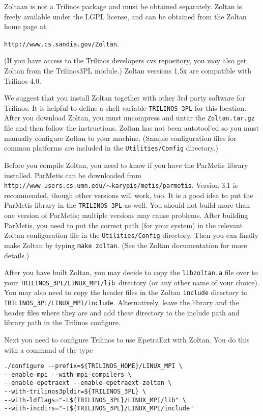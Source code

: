 Zoltaan is not a Trilinos package and must be obtained separately.
Zoltan is freely available under the LGPL license, and can
be obtained from the Zoltan home page at 

\texttt{http://www.cs.sandia.gov/Zoltan}. 

(If you have access to the Trilinos developers cvs repository, you may
also get Zoltan from the Trilinos3PL module.)  Zoltan versions 1.5x are
compatible with Trilinos 4.0.

We suggest that you install Zoltan together with other 3rd party software 
for Trilinos. It is helpful to define a shell variable \verb!TRILINOS_3PL! 
for this location. %
After 
you download Zoltan, you must uncompress and untar the
\verb!Zoltan.tar.gz! file and then follow the instructions. 
Zoltan has not been autotool'ed so you must manually configure
Zoltan to your machine. (Sample configuration files for common
platforms are included in the \verb!Utilities/Config! directory.) 

Before you compile Zoltan, you need to know if you have the ParMetis
library installed.  ParMetis can be downloaded from \\
\texttt{http://www-users.cs.umn.edu/$\sim$karypis/metis/parmetis}.
Version 3.1 is recommended, though other versions will work, too.  It is
a good idea to put the ParMetis library in the \verb!TRILINOS_3PL!  as
well. You should not build more than one version of ParMetis; multiple
versions may cause problems. After building ParMetis, you need to put
the correct path (for your system) in the relevant Zoltan configuration
file in the \verb!Utilities/Config! directory. Then you can finally make
Zoltan by typing \verb!make zoltan!. (See the Zoltan documentation for
more details.)

After you have built Zoltan, you may decide to copy the
\verb!libzoltan.a! file over to your
\verb!TRILINOS_3PL/LINUX_MPI/lib!~directory (or any other name of your
choice). You may also need to copy
the header files in the Zoltan \verb!include! directory to \\
\verb!TRILINOS_3PL/LINUX_MPI/include!.  Alternatively, leave the library
and the header files where they are and add these directory to the
include path and library path in the Trilinos configure.

Next you need to configure Trilinos to use EpetraExt with Zoltan.
You do this with a command of the type
\begin{verbatim}
./configure --prefix=${TRILINOS_HOME}/LINUX_MPI \
--enable-mpi --with-mpi-compilers \
--enable-epetraext --enable-epetraext-zoltan \
--with-trilinos3pldir=${TRILINOS_3PL} \
--with-ldflags="-L${TRILINOS_3PL}/LINUX_MPI/lib" \
--with-incdirs="-I${TRILINOS_3PL}/LINUX_MPI/include"
\end{verbatim}

